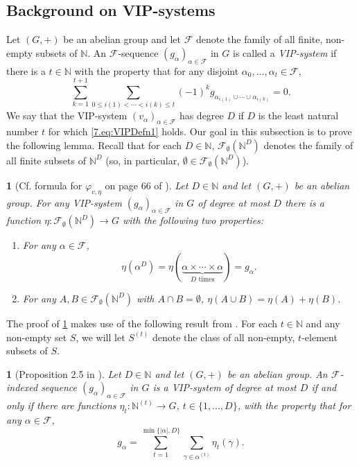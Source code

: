 \documentclass[11pt,american,preprint]{elsarticle}
\numberwithin{equation}{section}
\theoremstyle{plain}
\theoremstyle{plain*}
\theoremstyle{plain}
\newtheorem{lem}[thm]{\protect\lemmaname}
\theoremstyle{plain*}
\theoremstyle{plain}
\newtheorem{prop}[thm]{\protect\propositionname}
\theoremstyle{plain*}
\theoremstyle{remark}
\theoremstyle{remark*}
\theoremstyle{remark}
\theoremstyle{remark*}
\theoremstyle{remark}
\theoremstyle{remark*}
\theoremstyle{plain}
\theoremstyle{definition}
\theoremstyle{plain}
\theoremstyle{plain} %
\providecommand{\lemmaname}{Lemma}
\providecommand{\propositionname}{Proposition}
\newcommand{\N}{\mathbb{N}}
\begin{document}
 \subsection{Background on VIP-systems}
Let $(G,+)$ be an abelian  group and let $\mathcal F$ denote the family of all finite, non-empty subsets of $\N$. An $\mathcal F$-sequence $(g_\alpha)_{\alpha\in\mathcal F}$ in $G$  is called a \textit{VIP-system} if there is a $t\in\N$ with the property that  for any disjoint $\alpha_0,...,\alpha_t\in\mathcal F$,
\begin{equation}\label{7.eq:VIPDefn1}
\sum_{k=1}^{t+1}\sum_{0\leq i(1)<\cdots< i(k)\leq t}(-1)^kg_{\alpha_{i(1)}
\cup\cdots\cup \alpha_{i(k)}}=0.
\end{equation}
We say that the VIP-system $(v_\alpha)_{\alpha\in\mathcal F}$ has degree $D$ if $D$ is the least natural number $t$ for which \eqref{7.eq:VIPDefn1} holds. Our goal in this subsection is to prove the following lemma.  Recall that for each $D\in\N$, $\mathcal F_\emptyset(\N^D)$ denotes the family of all  finite subsets of $\N^D$ (so, in particular, $\emptyset\in \mathcal F_\emptyset (\N^D)$). 
\begin{lem}[Cf. formula for $\varphi_{v,\eta}$ on page 66 of \cite{BerLeibPolyHJ}]\label{7.lem:ShiftToSetPolynomial}
    Let  $D\in\N$ and let $(G,+)$ be an abelian group. For any VIP-system $(g_\alpha)_{\alpha\in\mathcal F}$ in $G$ of degree at most $D$ there is a function $\eta:\mathcal F_\emptyset (\N^D)\rightarrow G$ with the following two properties:
    \begin{enumerate}
       \item [(P.1)] For any $\alpha\in\mathcal F$,    $$\eta(\alpha^D)=\eta(\underbrace{\alpha\times\cdots\times\alpha}_{D\text{ times}})=g_\alpha.$$
         \item [(P.2)] For any $A,B\in\mathcal F_\emptyset (\N^D)$ with $A\cap B=\emptyset$, $\eta(A\cup B)=\eta(A)+\eta(B)$.
    \end{enumerate}
\end{lem}
The proof of \cref{7.lem:ShiftToSetPolynomial} makes use of the following result from \cite{McCutcheonInfinitaryPVW}. For each $t\in\N$ and any non-empty set $S$, we will let $S^{(t)}$ denote the class of all non-empty, $t$-element subsets of $S$. 
\begin{prop}[Proposition 2.5 in \cite{McCutcheonInfinitaryPVW}]\label{7.prop:LevelDecomposition}
    Let $D\in\N$ and let $(G,+)$ be an abelian group. An $\mathcal F$-indexed sequence $(g_\alpha)_{\alpha\in\mathcal F}$ in $G$ is a VIP-system of degree at most $D$ if and only if there are  functions $\eta_t:\N^{(t)}\rightarrow G$, $t\in\{1,...,D\}$, with the property that for any $\alpha\in\mathcal F$,
$$g_\alpha=\sum_{t=1}^{\min\{|\alpha|,D\}}\sum_{\gamma\in\mathcal \alpha^{(t)}}\eta_t(\gamma).$$
\end{prop}
\end{document}
